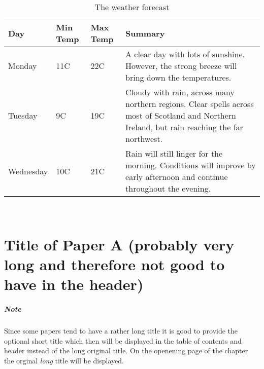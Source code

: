 \documentclass[%
]{USN-MSc}
\begin{document}
\lipsum[4]

\begin{table}[!ht]
 \caption{The weather forecast}
  \centering
   \begin{tabular}{ | l | l | l | p{5cm} |}
    \hline
    Day & Min Temp & Max Temp & Summary \\ \hline
    Monday & 11C & 22C & A clear day with lots of sunshine.
    However, the strong breeze will bring down the temperatures. \\ \hline
    Tuesday & 9C & 19C & Cloudy with rain, across many northern regions. Clear spells
    across most of Scotland and Northern Ireland,
    but rain reaching the far northwest. \\ \hline
    Wednesday & 10C & 21C & Rain will still linger for the morning.
    Conditions will improve by early afternoon and continue
    throughout the evening. \\
    \hline
    \end{tabular}
\end{table}

~\nocite{*}

\cleardoublepage

\printbibliography[heading=bibintoc]


\appendix


\chapter[Short Title of Paper A]{Title of Paper A (probably very long and therefore not good to have in the header)}
\label{paper-a}

\paragraph{Note}
Since some papers tend to have a rather long title it is good to provide the optional short title which then will be displayed in the table of contents and header instead of the long original title.
On the openening page of the chapter the orginal \emph{long} title will be displayed.\bigskip
\end{document}
